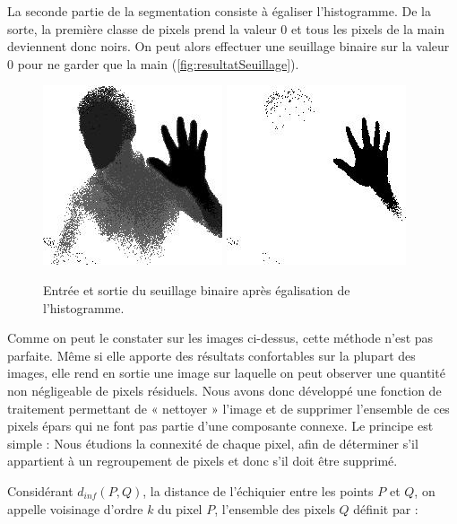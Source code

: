 La seconde partie de la segmentation consiste à égaliser l’histogramme. De la sorte, la première classe de pixels prend la valeur 0 et tous les pixels de la main deviennent donc noirs. On peut alors effectuer une seuillage binaire sur la valeur 0 pour ne garder que la main (\autoref{fig:resultatSeuillage}).

\begin{figure}[htb!]
\centerline{\includegraphics[scale=0.6]{thresholdIn.jpg} \includegraphics[scale=0.6]{thresholdOut.jpg}}
\caption{Entrée et sortie du seuillage binaire après égalisation de l'histogramme.}
\label{fig:resultatSeuillage}
\end{figure}

Comme on peut le constater sur les images ci-dessus, cette méthode n’est pas parfaite. Même si elle apporte des résultats confortables sur la plupart des images, elle rend en sortie une image sur laquelle on peut observer une quantité non négligeable de pixels résiduels. Nous avons donc développé une fonction de traitement permettant de « nettoyer » l’image et de supprimer l’ensemble de ces pixels épars qui ne font pas partie d’une composante connexe. Le principe est simple : Nous étudions la connexité de chaque pixel, afin de déterminer s’il appartient à un regroupement de pixels et donc s’il doit être supprimé.

Considérant $d_{inf}(P,Q)$, la distance de l’échiquier entre les points $P$ et $Q$, on appelle voisinage d’ordre $k$ du pixel $P$, l’ensemble des pixels $Q$ définit par : 

